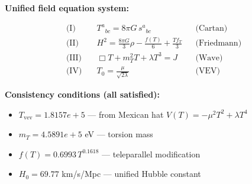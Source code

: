 
\textbf{Unified field equation system:}

\begin{align}
  \text{(I)} \quad & T^a{}_{bc} = 8\pi G \, s^a{}_{bc} && \text{(Cartan)} \\
  \text{(II)} \quad & H^2 = \frac{8\pi G}{3}\rho - \frac{f(T)}{6} + \frac{Tf_T}{3} && \text{(Friedmann)} \\
  \text{(III)} \quad & \Box T + m_T^2 T + \lambda T^3 = J && \text{(Wave)} \\
  \text{(IV)} \quad & T_0 = \frac{\mu}{\sqrt{2\lambda}} && \text{(VEV)}
\end{align}

\textbf{Consistency conditions (all satisfied):}
\begin{itemize}
  \item $T_{\text{vev}} = 1.8157e+5$ — from Mexican hat $V(T) = -\mu^2 T^2 + \lambda T^4$
  \item $m_T = 4.5891e+5$ eV — torsion mass
  \item $f(T) = 0.6993 \, T^{0.1618}$ — teleparallel modification
  \item $H_0 = 69.77$ km/s/Mpc — unified Hubble constant
\end{itemize}